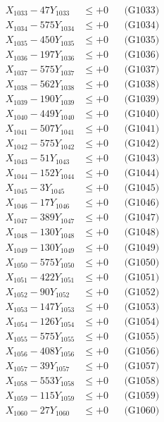 \documentclass[a4paper,10pt]{article}
\begin{document}
{\begin{align}
X_{1033} - 47Y_{1033} &\leq +0 && \text{(G1033)} \\
X_{1034} - 575Y_{1034} &\leq +0 && \text{(G1034)} \\
X_{1035} - 450Y_{1035} &\leq +0 && \text{(G1035)} \\
X_{1036} - 197Y_{1036} &\leq +0 && \text{(G1036)} \\
X_{1037} - 575Y_{1037} &\leq +0 && \text{(G1037)} \\
X_{1038} - 562Y_{1038} &\leq +0 && \text{(G1038)} \\
X_{1039} - 190Y_{1039} &\leq +0 && \text{(G1039)} \\
X_{1040} - 449Y_{1040} &\leq +0 && \text{(G1040)} \\
\allowbreak
X_{1041} - 507Y_{1041} &\leq +0 && \text{(G1041)} \\
X_{1042} - 575Y_{1042} &\leq +0 && \text{(G1042)} \\
X_{1043} - 51Y_{1043} &\leq +0 && \text{(G1043)} \\
X_{1044} - 152Y_{1044} &\leq +0 && \text{(G1044)} \\
X_{1045} - 3Y_{1045} &\leq +0 && \text{(G1045)} \\
X_{1046} - 17Y_{1046} &\leq +0 && \text{(G1046)} \\
X_{1047} - 389Y_{1047} &\leq +0 && \text{(G1047)} \\
X_{1048} - 130Y_{1048} &\leq +0 && \text{(G1048)} \\
X_{1049} - 130Y_{1049} &\leq +0 && \text{(G1049)} \\
X_{1050} - 575Y_{1050} &\leq +0 && \text{(G1050)} \\
\allowbreak
X_{1051} - 422Y_{1051} &\leq +0 && \text{(G1051)} \\
X_{1052} - 90Y_{1052} &\leq +0 && \text{(G1052)} \\
X_{1053} - 147Y_{1053} &\leq +0 && \text{(G1053)} \\
X_{1054} - 126Y_{1054} &\leq +0 && \text{(G1054)} \\
X_{1055} - 575Y_{1055} &\leq +0 && \text{(G1055)} \\
X_{1056} - 408Y_{1056} &\leq +0 && \text{(G1056)} \\
X_{1057} - 39Y_{1057} &\leq +0 && \text{(G1057)} \\
X_{1058} - 553Y_{1058} &\leq +0 && \text{(G1058)} \\
X_{1059} - 115Y_{1059} &\leq +0 && \text{(G1059)} \\
X_{1060} - 27Y_{1060} &\leq +0 && \text{(G1060)} \\

\end{align}}
\end{document}
